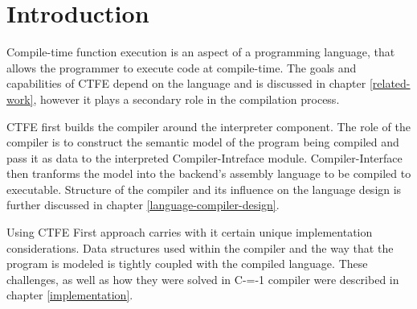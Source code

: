 \section{Introduction}

Compile-time function execution is an aspect of a programming language, that allows the programmer to execute code at compile-time.
The goals and capabilities of CTFE depend on the language and is discussed in chapter \ref{related-work}, however it plays a secondary role in the compilation process.

CTFE first builds the compiler around the interpreter component.
The role of the compiler is to construct the semantic model of the program being compiled and pass it as data to the interpreted Compiler-Intreface module.
Compiler-Interface then tranforms the model into the backend's assembly language to be compiled to executable.
Structure of the compiler and its influence on the language design is further discussed in chapter \ref{language-compiler-design}.

Using CTFE First approach carries with it certain unique implementation considerations.
Data structures used within the compiler and the way that the program is modeled is tightly coupled with the compiled language.
These challenges, as well as how they were solved in C-=-1 compiler were described in chapter \ref{implementation}.
